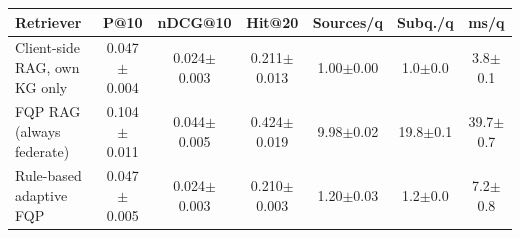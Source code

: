 \begin{tabular}{@{}lcccccc@{}}
\toprule
Retriever & P@10 & nDCG@10 & Hit@20 & Sources/q & Subq./q & ms/q \\
\midrule
Client-side RAG, own KG only & 0.047$\pm$0.004 & 0.024$\pm$0.003 & 0.211$\pm$0.013 & 1.00$\pm$0.00 & 1.0$\pm$0.0 & 3.8$\pm$0.1 \\
FQP RAG (always federate) & 0.104$\pm$0.011 & 0.044$\pm$0.005 & 0.424$\pm$0.019 & 9.98$\pm$0.02 & 19.8$\pm$0.1 & 39.7$\pm$0.7 \\
Rule-based adaptive FQP & 0.047$\pm$0.005 & 0.024$\pm$0.003 & 0.210$\pm$0.003 & 1.20$\pm$0.03 & 1.2$\pm$0.0 & 7.2$\pm$0.8 \\
\bottomrule
\end{tabular}
